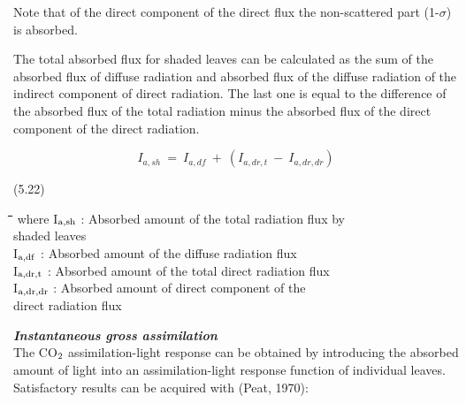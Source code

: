 \documentclass[11pt]{article}
\begin{document}
\bigskip
Note that of the direct component of the direct flux the non-scattered part (1-$\sigma$) is
absorbed.

\bigskip
\bigskip
The total absorbed flux for shaded leaves can be calculated as the sum of the absorbed
flux of diffuse radiation and absorbed flux of the diffuse radiation of the indirect
component of direct radiation. The last one is equal to the difference of the absorbed flux
of the total radiation minus the absorbed flux of the direct component of the direct
radiation.

\begin{displaymath}
I _{a,sh} ~=~ I _{a,df} ~+~ (I _{a,dr,t} ~-~ I _{a,dr,dr} )
\end{displaymath}

 \bigskip
\strut\hfill (5.22)
\nwln
\begin{tabbing}
\hspace{1.27cm}\=\hspace{1.27cm}\=\hspace{1.27cm}\=\hspace{1.27cm}\=%
\hspace{1.27cm}\=\hspace{1.27cm}\=\hspace{1.27cm}\=\hspace{1.27cm}\=%
\hspace{1.27cm}\=\hspace{1.27cm}\=\kill
where\> I$_{{\rm a,sh}}$\> : Absorbed amount of the total radiation flux by \\
\>\>   shaded leaves\> \> \> \> \> \> \> \> [J m$^{{\rm -2}}$ s$^{{\rm -1}}$]\\
\>I$_{{\rm a,df}}$\> : Absorbed amount of the diffuse radiation flux\> \> \> \> \> \> \> \> [J m$^{{\rm -2}}$ s$^{{\rm -1}}$]\\
\>I$_{{\rm a,dr,t}}$\> : Absorbed amount of the total direct radiation flux\> \> \> \> \> \> \> \> [J m$^{{\rm -2}}$ s$^{{\rm -1}}$]\\
\>I$_{{\rm a,dr,dr}}$\> : Absorbed amount of direct component of the \\
\>\>   direct radiation flux  \> \> \> \> \> \> \> \> [J m$^{{\rm -2}}$ s$^{{\rm -1}}$]
\end{tabbing}

\bigskip
{\bf {\it Instantaneous gross assimilation\/}}\\
The CO$_{{\rm 2}}$ assimilation-light response can be obtained by introducing the absorbed amount
of light into an assimilation-light response function of individual leaves. Satisfactory
results can be acquired with (Peat, 1970):
\end{document}

